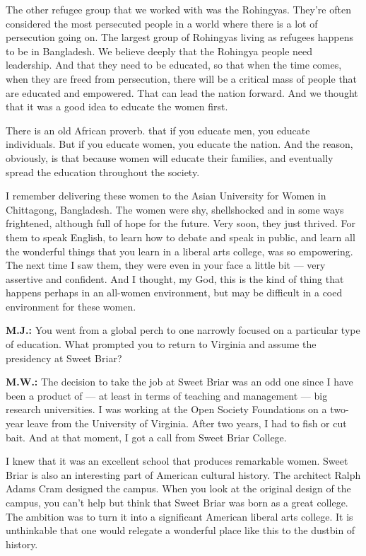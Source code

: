 The other refugee group that we worked with was the Rohingyas. They're
often considered the most persecuted people in a world where there is a
lot of persecution going on. The largest group of Rohingyas living as
refugees happens to be in Bangladesh. We believe deeply that the
Rohingya people need leadership. And that they need to be educated, so
that when the time comes, when they are freed from persecution, there
will be a critical mass of people that are educated and empowered. That
can lead the nation forward. And we thought that it was a good idea to
educate the women first.

There is an old African proverb. that if you educate men, you educate
individuals. But if you educate women, you educate the nation. And the
reason, obviously, is that because women will educate their families,
and eventually spread the education throughout the society.

I remember delivering these women to the Asian University for Women in
Chittagong, Bangladesh. The women were shy, shellshocked and in some
ways frightened, although full of hope for the future. Very soon, they
just thrived. For them to speak English, to learn how to debate and
speak in public, and learn all the wonderful things that you learn in a
liberal arts college, was so empowering. The next time I saw them, they
were even in your face a little bit --- very assertive and confident.
And I thought, my God, this is the kind of thing that happens perhaps in
an all-women environment, but may be difficult in a coed environment for
these women.

\textbf{M.J.:} You went from a global perch to one narrowly focused on a
particular type of education. What prompted you to return to Virginia
and assume the presidency at Sweet Briar?

\textbf{M.W.:} The decision to take the job at Sweet Briar was an odd
one since I have been a product of --- at least in terms of teaching and
management --- big research universities. I was working at the Open
Society Foundations on a two-year leave from the University of Virginia.
After two years, I had to fish or cut bait. And at that moment, I got a
call from Sweet Briar College.

I knew that it was an excellent school that produces remarkable women.
Sweet Briar is also an interesting part of American cultural history.
The architect Ralph Adams Cram designed the campus. When you look at the
original design of the campus, you can't help but think that Sweet Briar
was born as a great college. The ambition was to turn it into a
significant American liberal arts college. It is unthinkable that one
would relegate a wonderful place like this to the dustbin of history.

